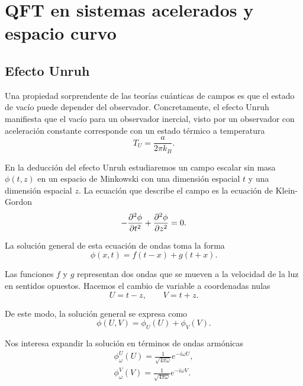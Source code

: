 \chapter{QFT en sistemas acelerados y espacio curvo}

\section{Efecto Unruh}

Una propiedad sorprendente de las teorías cuánticas de campos es que el estado de vacío
puede depender del observador.
Concretamente, el efecto Unruh manifiesta que el vacío para un observador inercial,
visto por un observador con aceleración constante corresponde con un estado térmico a temperatura
\begin{equation}
  T_U=\frac{a}{2\pi k_B}.
\end{equation}

En la deducción del efecto Unruh estudiaremos un campo escalar sin masa $\phi(t,z)$ en un espacio de Minkowski
con una dimensión espacial $t$ y una dimensión espacial $z$.  
La ecuación que describe el campo es la ecuación de Klein-Gordon
\begin{equation}
  -\pdv[2]{\phi}{t}+\pdv[2]{\phi}{z}=0.
\end{equation}

La solución general de esta ecuación de ondas toma la forma
\begin{equation}
  \phi(x,t)=f(t-x)+g(t+x).
\end{equation}

Las funciones $f$ y $g$ representan dos ondas que se mueven a la velocidad de la luz en sentidos
opuestos. 
Hacemos el cambio de variable a coordenadas nulas
\begin{equation}
  U=t-z,   \qquad V=t+z.
\end{equation}

De este modo, la solución general se expresa como
\begin{equation}
  \phi(U,V)=\phi_U(U)+\phi_V(V).
\end{equation}

Nos interesa expandir la solución en términos de ondas armónicas
\begin{gather}
  \phi_\omega^U(U)=\frac{1}{\sqrt{4\pi\omega}} e^{-i\omega U},  \\
  \phi_\omega^V(V)=\frac{1}{\sqrt{4\pi\omega}} e^{-i\omega V}.
\end{gather}

